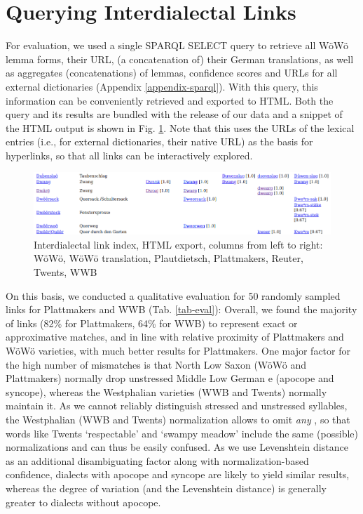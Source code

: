 \section{Querying Interdialectal Links}

For evaluation, we used a single SPARQL SELECT query to retrieve all WöWö lemma forms, their URL, (a concatenation of) their German translations, as well as aggregates (concatenations) of lemmas, confidence scores and URLs for all external dictionaries (Appendix \ref{appendix-sparql}). With this query, this information can be conveniently retrieved and exported to HTML. Both the query and its results are bundled with the release of our data and a snippet of the HTML output is shown in Fig. \ref{fig-interdialectal-links-in-html}. Note that this uses the URLs of the lexical entries (i.e., for external dictionaries, their native URL) as the basis for hyperlinks, so that all links can be interactively explored.

\begin{figure}
    \centering
    \includegraphics[width=1\linewidth]{img/html.png}
    \caption{Interdialectal link index, HTML export, columns from left to right: WöWö, WöWö translation, Plautdietsch, Plattmakers, Reuter, Twents, WWB}
    \label{fig-interdialectal-links-in-html}
\end{figure}

On this basis, we conducted a qualitative evaluation for 50 randomly sampled links for Plattmakers and WWB (Tab. \ref{tab-eval}): 
Overall, we found the majority of links (82\% for Plattmakers, 64\% for WWB) to represent exact or approximative matches, and in line with relative proximity of Plattmakers and WöWö varieties, with much better results for Plattmakers. One major factor for the high number of mismatches is that North Low Saxon (WöWö and Plattmakers) normally drop unstressed Middle Low German e (apocope and syncope), whereas the Westphalian varieties (WWB and Twents) normally maintain it. 
As we cannot reliably distinguish stressed and unstressed syllables, the Westphalian (WWB and Twents) normalization allows to omit \emph{any} , so that words like Twents  `respectable' and  `swampy meadow' include the same (possible) normalizations and can thus be easily confused. As we use Levenshtein distance as an additional disambiguating factor along with normalization-based confidence, dialects with apocope and syncope are likely to yield similar results, whereas the degree of variation (and the Levenshtein distance) is generally greater to dialects without apocope.

